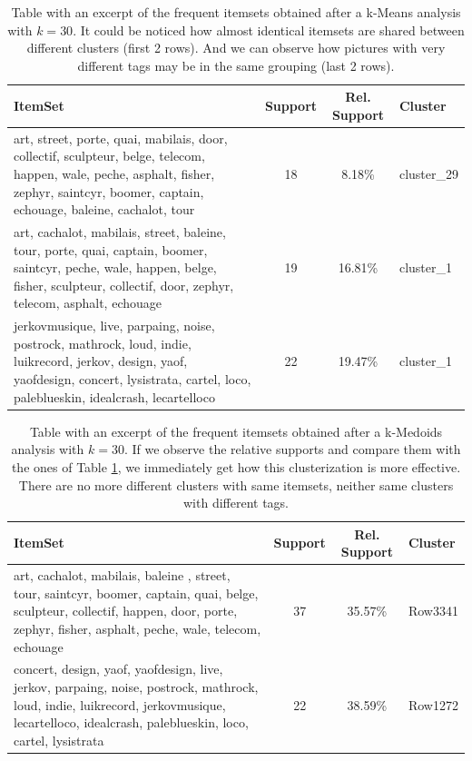 \documentclass[runningheads]{llncs}
\begin{document}
\begin{table}
\caption{Table with an excerpt of the frequent itemsets obtained after a k-Means analysis with $k=30$. It could be noticed how almost identical itemsets are shared between different clusters (first 2 rows). And we can observe how pictures with very different tags may be in the same grouping (last 2 rows).}\label{tab1}
\begin{tabular}{|p{7cm}|c|c|l|}
\hline
\textbf{ItemSet} &  \textbf{Support} & \textbf{Rel. Support} & \textbf{Cluster}\\
\hline
art, street, porte, quai, mabilais, door, collectif, sculpteur, belge, telecom, happen, wale, peche, asphalt, fisher, zephyr, saintcyr, boomer, captain, echouage, baleine, cachalot, tour & 18 & 8.18\% & cluster\_29\\
\hline
art, cachalot, mabilais, street, baleine, tour, porte, quai, captain, boomer, saintcyr, peche, wale, happen, belge, fisher, sculpteur, collectif, door, zephyr, telecom, asphalt, echouage & 19 & 16.81\% & cluster\_1\\
\hline
 jerkovmusique,  live, parpaing, noise, postrock, mathrock, loud, indie, luikrecord, jerkov, design, yaof, yaofdesign, concert, lysistrata, cartel, loco, paleblueskin, idealcrash, lecartelloco & 22 & 19.47\% & cluster\_1\\
\hline
\end{tabular}
\end{table}

\begin{table}
\caption{Table with an excerpt of the frequent itemsets obtained after a k-Medoids analysis with $k=30$. If we observe the relative supports and compare them with the ones of Table \ref{tab1}, we immediately get how this clusterization is more effective. There are no more different clusters with same itemsets, neither same clusters with different tags.}\label{tab2}
\begin{tabular}{|p{7cm}|c|c|l|}
\hline
\textbf{ItemSet} &  \textbf{Support} & \textbf{Rel. Support} & \textbf{Cluster}\\
\hline
art, cachalot, mabilais, baleine , street, tour, saintcyr, boomer, captain, quai, belge, sculpteur, collectif, happen, door, porte, zephyr, fisher, asphalt, peche, wale, telecom, echouage & 37 & 35.57\% & Row3341\\
\hline
concert, design, yaof, yaofdesign, live, jerkov, parpaing, noise, postrock, mathrock, loud, indie, luikrecord, jerkovmusique, lecartelloco, idealcrash, paleblueskin, loco, cartel, lysistrata & 22 & 38.59\% & Row1272\\
\hline
\end{tabular}
\end{table}
\end{document}
